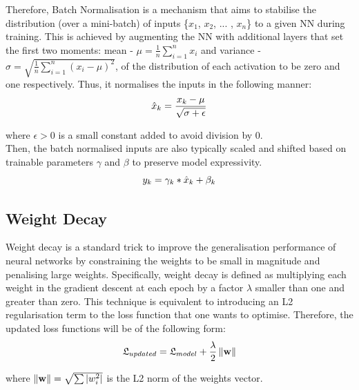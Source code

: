 Therefore, Batch Normalisation is a mechanism that aims to stabilise the distribution (over a mini-batch) of inputs \{$x_1$, $x_2$, ... , $x_n$\} to a given NN during training. This is achieved by augmenting the NN with additional layers that set the first two moments: mean - $\mu = \frac{1}{n} \sum_{i=1}^n x_i$ and variance - $\sigma = \sqrt{\frac{1}{n} \sum_{i=1}^n (x_i - \mu) ^ 2}$, of the distribution of each activation to be zero and one respectively. Thus, it normalises the inputs in the following manner: \\

\begin{equation}
  \centering
  \hat{x}_k = \frac{x_k - \mu}{\sqrt{\sigma + \epsilon}}
\end{equation}

where $\epsilon > 0$ is a small constant added to avoid division by 0. \\

Then, the batch normalised inputs are also typically scaled and shifted based on trainable parameters $\gamma$ and $\beta$ to preserve model expressivity. \\

\begin{equation}
  \centering
  y_k = \gamma_k * \hat{x}_k + \beta_k
\end{equation}

\subsection{Weight Decay}
Weight decay is a standard trick to improve the generalisation performance of neural
networks by constraining the weights to be small in magnitude and penalising large weights. Specifically, weight decay is defined as multiplying each weight in the gradient descent at each epoch by a factor $\lambda$ smaller than one and greater than zero. This technique is equivalent to introducing an L2 regularisation term to the loss function that one wants to optimise. Therefore, the updated loss functions will be of the following form: \\

\begin{equation} \label{weight_decay}
  \centering
  \mathfrak{L}_{updated} = \mathfrak{L}_{model} + \frac{\lambda}{2} \norm{\textbf{w}}
\end{equation} 

where $\left\lVert\textbf{w}\right\rVert = \sqrt{\sum |w_i^2|}$ is the L2 norm of the weights vector.\\

